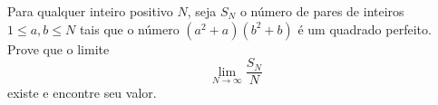 Para qualquer inteiro positivo \(N\), seja \(S_N\) o número de pares de inteiros \(1 \le a, b \le N\) tais que o número \((a^2 + a)(b^2 + b)\) é um quadrado perfeito. Prove que o limite
\[
\lim_{N \to \infty} \frac{S_N}{N}
\]
existe e encontre seu valor.
